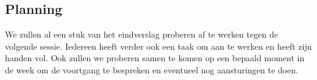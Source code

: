 \documentclass{kulakarticle}
\begin{document}
	
	\subsection{Planning}
	We zullen al een stuk van het eindverslag proberen af te werken tegen de volgende sessie. Iedereen heeft verder ook een taak om aan te werken en heeft zijn handen vol. Ook zullen we proberen samen te komen op een bepaald moment in de week om de voortgang te bespreken en eventueel nog aansturingen te doen.
	
	
	
\end{document}
